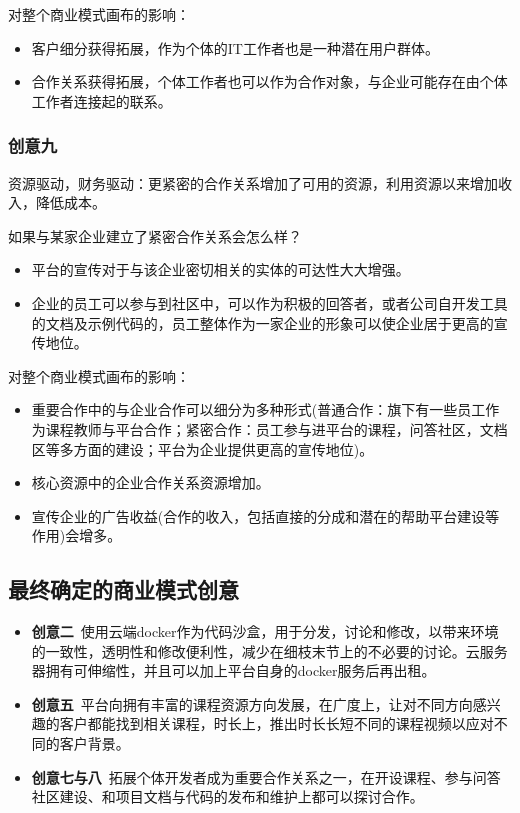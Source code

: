 \documentclass[a4paper]{ctexart}
\begin{document}
对整个商业模式画布的影响：
\begin{itemize}
  \item 客户细分获得拓展，作为个体的IT工作者也是一种潜在用户群体。
  \item 合作关系获得拓展，个体工作者也可以作为合作对象，与企业可能存在由个体工作者连接起的联系。
\end{itemize}

\subsubsection{创意九}
资源驱动，财务驱动：更紧密的合作关系增加了可用的资源，利用资源以来增加收入，降低成本。

如果与某家企业建立了紧密合作关系会怎么样？
\begin{itemize}
  \item 平台的宣传对于与该企业密切相关的实体的可达性大大增强。
  \item 企业的员工可以参与到社区中，可以作为积极的回答者，或者公司自开发工具的文档及示例代码的，员工整体作为一家企业的形象可以使企业居于更高的宣传地位。
\end{itemize}

对整个商业模式画布的影响：
\begin{itemize}
  \item 重要合作中的与企业合作可以细分为多种形式(普通合作：旗下有一些员工作为课程教师与平台合作；紧密合作：员工参与进平台的课程，问答社区，文档区等多方面的建设；平台为企业提供更高的宣传地位)。
  \item 核心资源中的企业合作关系资源增加。
  \item 宣传企业的广告收益(合作的收入，包括直接的分成和潜在的帮助平台建设等作用)会增多。
\end{itemize}

\subsection{最终确定的商业模式创意}
\begin{itemize}
  \item \textbf{创意二}\ 使用云端docker作为代码沙盒，用于分发，讨论和修改，以带来环境的一致性，透明性和修改便利性，减少在细枝末节上的不必要的讨论。云服务器拥有可伸缩性，并且可以加上平台自身的docker服务后再出租。
  \item\textbf{创意五}\ 平台向拥有丰富的课程资源方向发展，在广度上，让对不同方向感兴趣的客户都能找到相关课程，时长上，推出时长长短不同的课程视频以应对不同的客户背景。
  \item\textbf{创意七与八}\ 拓展个体开发者成为重要合作关系之一，在开设课程、参与问答社区建设、和项目文档与代码的发布和维护上都可以探讨合作。
\end{itemize}
\end{document}
